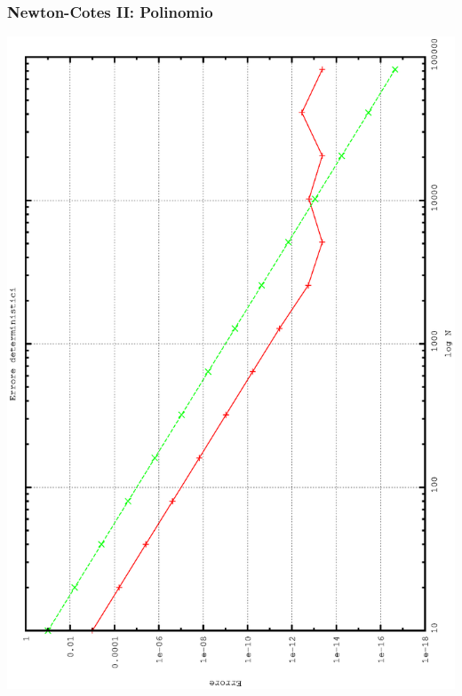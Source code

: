 \subsubsection{Newton-Cotes II: Polinomio}
\begin{center}
\includegraphics[width=0.7\columnwidth,angle=-90]{plot_simp_poly.eps}
\end{center}

